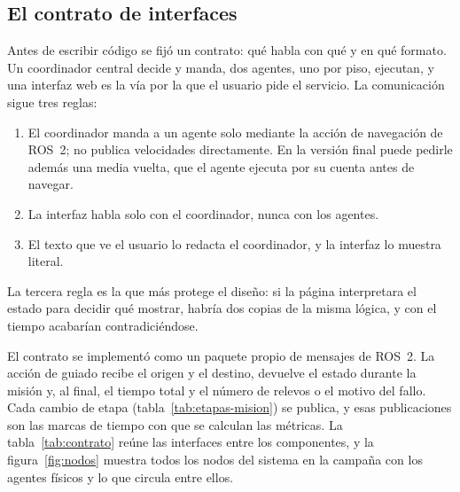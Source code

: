 \subsection{El contrato de interfaces}
\label{sec:contrato}

Antes de escribir código se fijó un contrato: qué habla con qué y en qué formato.
Un coordinador central decide y manda, dos agentes, uno por piso, ejecutan, y una
interfaz web es la vía por la que el usuario pide el servicio. La comunicación
sigue tres reglas:

\begin{enumerate}[leftmargin=*]
  \item El coordinador manda a un agente solo mediante la acción de navegación
    de ROS~2; no publica velocidades directamente. En la versión final puede
    pedirle además una media vuelta, que el agente ejecuta por su cuenta antes de navegar.
  \item La interfaz habla solo con el coordinador, nunca con los agentes.
  \item El texto que ve el usuario lo redacta el coordinador, y la interfaz lo
    muestra literal.
\end{enumerate}

La tercera regla es la que más protege el diseño: si la página interpretara el estado para decidir qué mostrar, habría dos copias de la misma lógica, y con el tiempo acabarían contradiciéndose.

El contrato se implementó como un paquete propio de mensajes de ROS~2. La acción
de guiado recibe el origen y el destino, devuelve el estado durante la misión y,
al final, el tiempo total y el número de relevos o el motivo del fallo. Cada
cambio de etapa (tabla~\ref{tab:etapas-mision}) se publica, y esas publicaciones
son las marcas de tiempo con que se calculan las métricas. La tabla~\ref{tab:contrato} reúne las interfaces entre los componentes, y la figura~\ref{fig:nodos} muestra todos los nodos del sistema en la campaña con los agentes físicos y lo que circula entre ellos.

